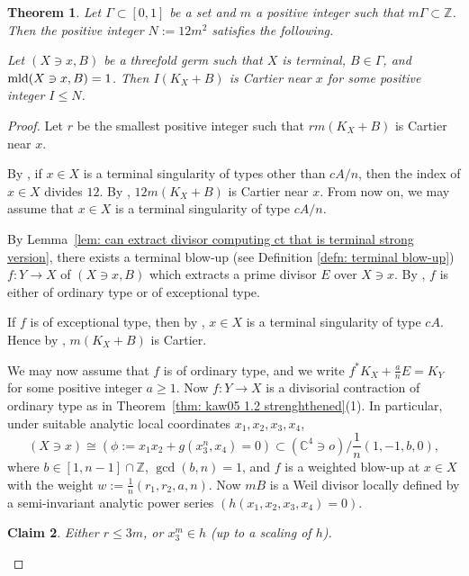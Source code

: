 \documentclass[11pt]{amsart}
\numberwithin{equation}{section}
\newcommand{\Zz}{\mathbb{Z}}
\newcommand{\mld}{{\rm{mld}}}
\newcommand{\Ii}{{\Gamma}}
\newtheorem{thm}{Theorem}[section]
\newtheorem{claim}[thm]{Claim}
\theoremstyle{definition}
\theoremstyle{definition}
\begin{document}
\begin{thm}\label{thm: index conjecture threefold}
Let $\Gamma\subset[0,1]$ be a set and $m$ a positive integer such that $m\Gamma\subset \mathbb{Z}$. Then the positive integer $N:=12m^2$ satisfies the following.

Let $(X\ni x, B)$ be a threefold germ such that $X$ is terminal, $B\in \Ii$, and $\mld(X\ni x, B)=1$. Then $I(K_X+B)$ is Cartier near $x$ for some positive integer $I\le N$. 
\end{thm}


\begin{proof}
Let $r$ be the smallest positive integer such that $rm(K_X+B)$ is Cartier near $x$.

\medskip


By \cite[(6.1) Theorem]{Rei87}, if $x\in X$ is a terminal singularity of types other than $cA/n$, then the index of $x\in X$ divides $12$. By \cite[Lemma~5.1]{Kaw88}, $12m(K_X+B)$ is Cartier near $x$. From now on, we may assume that $x\in X$ is a terminal singularity of type $cA/n$.

\medskip


By Lemma~\ref{lem: can extract divisor computing ct that is terminal strong version}, there exists a terminal blow-up (see Definition \ref{defn: terminal blow-up}) $f: Y\to X$ of $(X\ni x,B)$ which extracts a prime divisor $E$ over $X\ni x$. By \cite[Theorem~1.1]{Kaw05}, $f$ is either of ordinary type or of exceptional type.

If $f$ is of exceptional type, then by \cite[Theorem~1.3]{Kaw05}, $x\in X$ is a terminal singularity of type $cA$. Hence by \cite[Lemma~5.1]{Kaw88}, $m(K_X+B)$ is Cartier.

We may now assume that $f$ is of ordinary type, and we write $f^*K_X+\frac{a}{n}E=K_Y$ for some positive integer $a\geq 1$. Now $f: Y\to X$ is a divisorial contraction of ordinary type as in Theorem~\ref{thm: kaw05 1.2 strenghthened}(1). In particular, under suitable analytic local coordinates $x_1,x_2,x_3,x_4$, $$(X\ni x)\cong (\phi:= x_1x_2+g(x_3^n,x_4)=0)\subset (\mathbb C^4\ni o)/\frac{1}{n}(1,-1,b,0),$$ where $b\in [1,n-1]\cap \Zz$, $\gcd(b,n)=1$, and $f$ is a weighted blow-up at $x\in X$ with the weight $w:=\frac{1}{n}(r_1,r_2,a,n)$. Now $mB$ is a Weil divisor locally defined by a semi-invariant analytic power series $(h(x_1,x_2,x_3,x_4)=0)$.

\medskip


\begin{claim}\label{claim: control the index or finding an elephant in B}
Either $r\leq 3m$, or $x_3^m\in h$ (up to a scaling of $h$).
\end{claim}


\end{proof}
\end{document}
